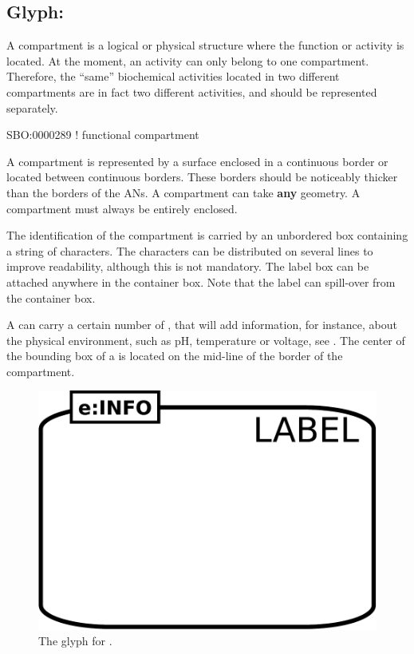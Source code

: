 \subsection{Glyph: }\label{sec:compartment}

A compartment is a logical or physical structure where the function or activity is located.  At the moment, an activity can only belong to one compartment. Therefore, the ``same'' biochemical activities located in two different compartments are in fact two different activities, and should be represented separately.

\begin{glyphDescription}

\glyphSboTerm  SBO:0000289 ! functional compartment

\glyphContainer A compartment is represented by a surface enclosed in a continuous border or located between continuous borders. These borders should be noticeably thicker than the borders of the ANs. A compartment can take \textbf{any} geometry. A compartment must always be entirely enclosed.

\glyphLabel The identification of the compartment is carried by an unbordered box containing a string of characters. The characters can be distributed on several lines to improve readability, although this is not mandatory. The label box can be attached anywhere in the container box. Note that the label can spill-over from the container box.

\glyphAux A  can carry a certain number of , that will add information, for instance, about the physical environment, such as pH, temperature or voltage, see .  The center of the bounding box of a  is located on the mid-line of the border of the compartment.

\end{glyphDescription}

\begin{figure}[H]
  \centering
  \includegraphics[scale = 0.3]{images/compartment}
  \caption{The \AF glyph for .}
  \label{fig:af:compartment}
\end{figure}

